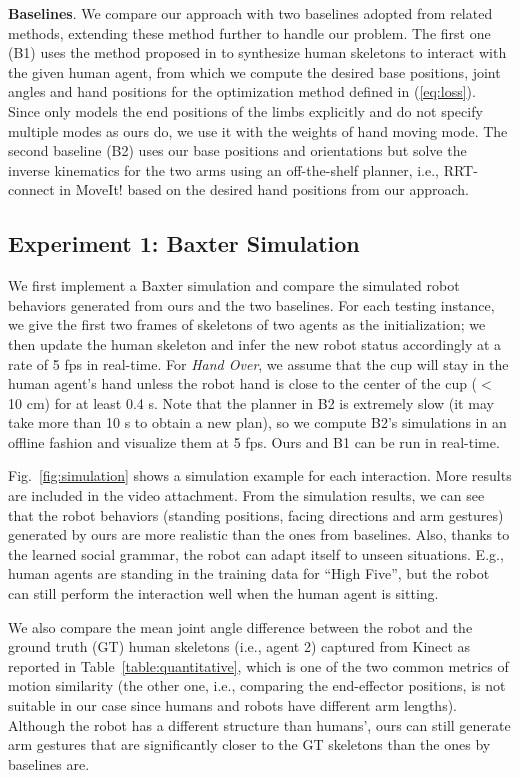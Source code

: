 \documentclass[letterpaper, 10 pt, conference]{ieeeconf}  %
\begin{document}
\textbf{Baselines}. We compare our approach with two baselines adopted from related methods, extending these method further to handle our problem. The first one (B1) uses the method proposed in \cite{Shuijcai2016} to synthesize human skeletons to interact with the given human agent, from which we compute the desired base positions, joint angles and hand positions for the optimization method defined in (\ref{eq:loss}). Since \cite{Shuijcai2016} only models the end positions of the limbs explicitly and do not specify multiple modes as ours do, we use it with the weights of hand moving mode. The second baseline (B2) uses our base positions and orientations but solve the inverse kinematics for the two arms using an off-the-shelf planner, i.e., RRT-connect \cite{Kuffner2000} in MoveIt! based on the desired hand positions from our approach.

\subsection{Experiment 1: Baxter Simulation}
We first implement a Baxter simulation and compare the simulated robot behaviors generated from ours and the two baselines. For each testing instance, we give the first two frames of skeletons of two agents as the initialization; we then update the human skeleton and infer the new robot status accordingly at a rate of 5 fps in real-time. For \textit{Hand Over}, we assume that the cup will stay in the human agent's hand unless the robot hand is close to the center of the cup ($<$ 10 cm) for at least 0.4 s. Note that the planner in B2 is extremely slow (it may take more than 10 s to obtain a new plan), so we compute B2's simulations in an offline fashion and visualize them at 5 fps. Ours and B1 can be run in real-time.

Fig.~\ref{fig:simulation} shows a simulation example for each interaction. More results are included in the video attachment. From the simulation results, we can see that the robot behaviors (standing positions, facing directions and arm gestures) generated by ours are more realistic than the ones from baselines. Also, thanks to the learned social grammar, the robot can adapt itself to unseen situations. E.g., human agents are standing in the training data for ``High Five'', but the robot can still perform the interaction well when the human agent is sitting. 

We also compare the mean joint angle difference between the robot and the ground truth (GT) human skeletons (i.e., agent 2) captured from Kinect as reported in Table~{\ref{table:quantitative}}, which is one of the two common metrics of motion similarity \cite{Alibeigi2017} (the other one, i.e., comparing the end-effector positions, is not suitable in our case since humans and robots have different arm lengths). Although the robot has a different structure than humans', ours can still generate arm gestures that are significantly closer to the GT skeletons than the ones by baselines are. %
\end{document}
